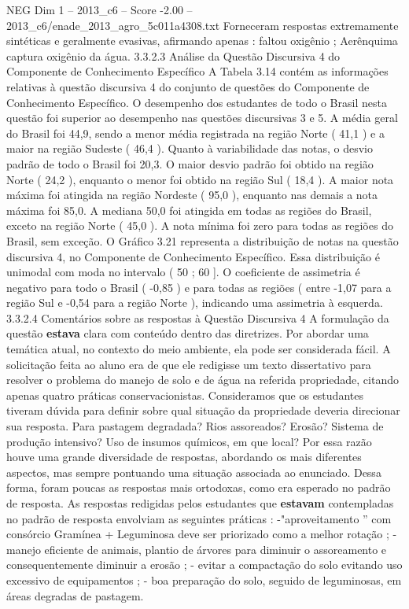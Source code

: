 \begin{textsample}{NEG Dim 1 – 2013\_c6 – Score -2.00 – 2013\_c6/enade\_2013\_agro\_5c011a4308.txt}
Forneceram respostas extremamente sintéticas e geralmente evasivas, afirmando apenas : faltou oxigênio ; Aerênquima captura oxigênio da água. 3.3.2.3 Análise da Questão Discursiva 4 do Componente de Conhecimento Específico A Tabela 3.14 contém as informações relativas à questão discursiva 4 do conjunto de questões do Componente de Conhecimento Específico.
O desempenho dos estudantes de todo o Brasil nesta questão foi superior ao desempenho nas questões discursivas 3 e 5.
A média geral do Brasil foi 44,9, sendo a menor média registrada na região Norte ( 41,1 ) e a maior na região Sudeste ( 46,4 ).
Quanto à variabilidade das notas, o desvio padrão de todo o Brasil foi 20,3.
O maior desvio padrão foi obtido na região Norte ( 24,2 ), enquanto o menor foi obtido na região Sul ( 18,4 ).
A maior nota máxima foi atingida na região Nordeste ( 95,0 ), enquanto nas demais a nota máxima foi 85,0.
A mediana 50,0 foi atingida em todas as regiões do Brasil, exceto na região Norte ( 45,0 ).
A nota mínima foi zero para todas as regiões do Brasil, sem exceção.
O Gráfico 3.21 representa a distribuição de notas na questão discursiva 4, no Componente de Conhecimento Específico.
Essa distribuição é unimodal com moda no intervalo ( 50 ; 60 ].
O coeficiente de assimetria é negativo para todo o Brasil ( -0,85 ) e para todas as regiões ( entre -1,07 para a região Sul e -0,54 para a região Norte ), indicando uma assimetria à esquerda. 3.3.2.4 Comentários sobre as respostas à Questão Discursiva 4 A formulação da questão \textbf{estava} clara com conteúdo dentro das diretrizes.
Por abordar uma temática atual, no contexto do meio ambiente, ela pode ser considerada fácil.
A solicitação feita ao aluno era de que ele redigisse um texto dissertativo para resolver o problema do manejo de solo e de água na referida propriedade, citando apenas quatro práticas conservacionistas.
Consideramos que os estudantes tiveram dúvida para definir sobre qual situação da propriedade deveria direcionar sua resposta.
Para pastagem degradada?
Rios assoreados?
Erosão?
Sistema de produção intensivo?
Uso de insumos químicos, em que local?
Por essa razão houve uma grande diversidade de respostas, abordando os mais diferentes aspectos, mas sempre pontuando uma situação associada ao enunciado.
Dessa forma, foram poucas as respostas mais ortodoxas, como era esperado no padrão de resposta.
As respostas redigidas pelos estudantes que \textbf{estavam} contempladas no padrão de resposta envolviam as seguintes práticas : -"aproveitamento ” com consórcio Gramínea + Leguminosa deve ser priorizado como a melhor rotação ; - manejo eficiente de animais, plantio de árvores para diminuir o assoreamento e consequentemente diminuir a erosão ; - evitar a compactação do solo evitando uso excessivo de equipamentos ; - boa preparação do solo, seguido de leguminosas, em áreas degradas de pastagem.

\end{textsample}
